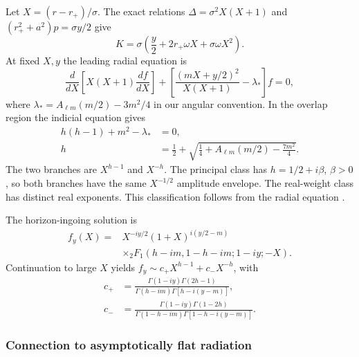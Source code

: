 \documentclass[aps,prd,twocolumn,10pt,nofootinbib,superscriptaddress,floatfix]{revtex4-2}
\begin{document}
Let $X=(r-r_+)/\sigma$.  The exact relations
$\Delta=\sigma^2X(X+1)$ and $(r_+^2+a^2)p=\sigma y/2$ give
\begin{equation}
K=\sigma\left(\frac y2+2r_+\omega X+\sigma\omega X^2\right).
\end{equation}
At fixed $X,y$ the leading radial equation is
\begin{equation}
\frac{d}{dX}\left[X(X+1)\frac{df}{dX}\right]
+\left[\frac{(mX+y/2)^2}{X(X+1)}-\lambda_*\right]f=0,
\label{eq:principal-near-ode}
\end{equation}
where $\lambda_*=A_{\ell m}(m/2)-3m^2/4$ in our angular convention.
In the overlap region the indicial equation gives
\begin{align}
h(h-1)+m^2-\lambda_*&=0,\nonumber\\
h&=\frac12+\sqrt{\frac14+A_{\ell m}(m/2)-\frac{7m^2}{4}}.
\label{eq:principal-weight}
\end{align}
The two branches are $X^{h-1}$ and $X^{-h}$.
The principal class has $h=1/2+i\beta$, $\beta>0$, so both branches have
the same $X^{-1/2}$ amplitude envelope.  The real-weight class has distinct
real exponents.  This classification follows from the radial equation
\cite{BredbergKerrCFT2010}.

The horizon-ingoing solution is
\begin{align}
f_y(X)={}&X^{-iy/2}(1+X)^{i(y/2-m)}\nonumber\\
&\times{}_2F_1(h-im,1-h-im;1-iy;-X).
\label{eq:principal-near-solution}
\end{align}
Continuation to large $X$ yields $f_y\sim c_+X^{h-1}+c_-X^{-h}$, with
\begin{align}
c_+&=\frac{\Gamma(1-iy)\Gamma(2h-1)}
{\Gamma(h-im)\Gamma[h-i(y-m)]},\nonumber\\
c_-&=\frac{\Gamma(1-iy)\Gamma(1-2h)}
{\Gamma(1-h-im)\Gamma[1-h-i(y-m)]}.
\label{eq:principal-near-connection}
\end{align}

\subsubsection{Connection to asymptotically flat radiation}
\end{document}
